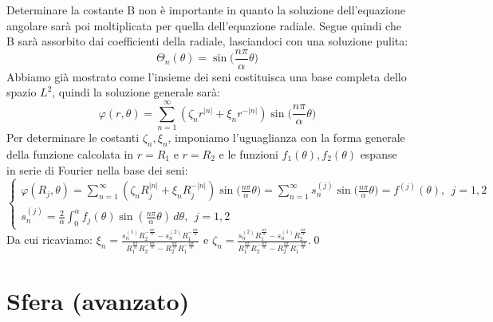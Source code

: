 \documentclass[a4paper,12pt]{report}
\begin{document}
Determinare la costante B non è importante in quanto la soluzione dell'equazione angolare sarà poi moltiplicata per quella dell'equazione radiale. Segue quindi che B sarà assorbito dai coefficienti della radiale, lasciandoci con una soluzione pulita:
\[\Theta_n(\theta)=\sin\bigg(\frac{n\pi}{\alpha}\theta\bigg)\]
Abbiamo già mostrato come l'insieme dei seni costituisca una base completa dello spazio $L^2$, quindi la soluzione generale sarà:
\[\varphi(r,\theta)=\sum_{n=1}^\infty(\zeta_nr^{|n|}+\xi_nr^{-|n|})\sin\bigg(\frac{n\pi}{\alpha}\theta\bigg)\]
Per determinare le costanti $\zeta_n,\xi_n$, imponiamo l'uguaglianza con la forma generale della funzione calcolata in $r=R_1$ e $r=R_2$ e le funzioni $f_1(\theta), f_2(\theta)$ espanse in serie di Fourier nella base dei seni:
\[\begin{cases}
    \varphi(R_j,\theta)=\sum_{n=1}^\infty(\zeta_nR_j^{|n|}+\xi_nR_j^{-|n|})\sin{\bigg(\frac{n\pi}{\alpha}\theta\bigg)=\sum_{n=1}^\infty s_n^{(j)}\sin\bigg(\frac{n\pi}{\alpha}\theta\bigg)=f^{(j)}(\theta), \ \ j=1,2}
    \\s_n^{(j)}
=
\frac{2}{\alpha}
\int_0^\alpha
f_j(\theta)
\sin\left(\frac{n\pi}{\alpha}\theta\right)
\,d\theta, \ \ j=1,2
\end{cases}\]
Da cui ricaviamo: $\xi_n =
\displaystyle
\frac{
s_n^{(1)} R_2^{-\frac{n\pi}{\alpha}}
-
s_n^{(2)} R_1^{-\frac{n\pi}{\alpha}}
}{
R_1^{\frac{n\pi}{\alpha}}R_2^{-\frac{n\pi}{\alpha}}
-
R_2^{\frac{n\pi}{\alpha}}R_1^{-\frac{n\pi}{\alpha}}
}$ e $\zeta_n =
\displaystyle
\frac{
s_n^{(2)} R_1^{\frac{n\pi}{\alpha}}
-
s_n^{(1)} R_2^{\frac{n\pi}{\alpha}}
}{
R_1^{\frac{n\pi}{\alpha}}R_2^{-\frac{n\pi}{\alpha}}
-
R_2^{\frac{n\pi}{\alpha}}R_1^{-\frac{n\pi}{\alpha}}
}$.\qed

\newpage

\section{Sfera (avanzato)}
\end{document}
